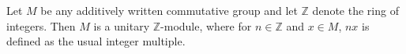 Let $M$ be any additively written commutative group and let $\mathbb{Z}$ denote the ring of integers. Then $M$ is a unitary $\mathbb{Z}$-module, where for $n \in \mathbb{Z}$ and $x \in M$, $nx$ is defined as the usual integer multiple.
